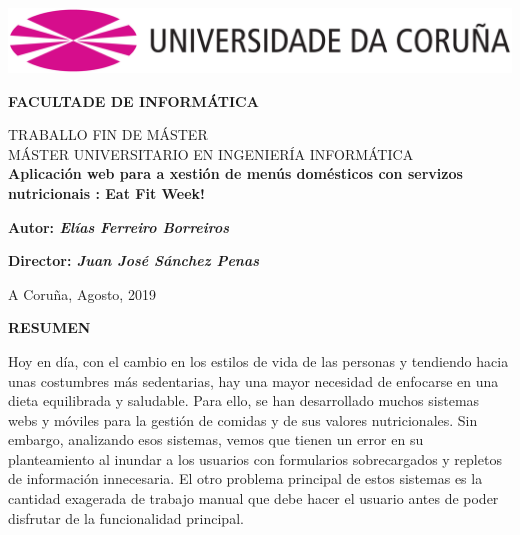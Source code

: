 \documentclass[12pt, a4paper, twoside]{book}
\begin{document}
	
	
	\thispagestyle{empty} 	
	
	\begin{center}		
		\includegraphics[width=15cm]{Imagenes/Simbolo_logo_UDC.png}
	\end{center}
	
	\vspace{2cm}
	
	\begin{center}		
		{\textbf{ FACULTADE DE INFORMÁTICA}}
			
		\vspace{1cm}
		\LARGE{ TRABALLO FIN DE MÁSTER }	\\
		\LARGE{ MÁSTER UNIVERSITARIO EN INGENIERÍA INFORMÁTICA } \\
		\vspace{1cm}	
		\LARGE{\textbf{ Aplicación web para a xestión de menús domésticos con servizos nutricionais : Eat Fit Week! }}
	\end{center}
	
	\vspace{2cm}
	\hfill \textbf{Autor: \textit{Elías Ferreiro Borreiros}}
	
	
	\hfill \textbf{Director: \textit{Juan José Sánchez Penas}} 
	
	
	\hfill A Coruña, Agosto, 2019					
	
	\clearpage
	
	\begin{center}
		\LARGE{\textbf{ RESUMEN }}	
	\end{center}
	Hoy en día, con el cambio en los estilos de vida de las personas y tendiendo hacia unas costumbres más sedentarias, hay una mayor necesidad de enfocarse en una dieta equilibrada y saludable.
	Para ello, se han desarrollado muchos sistemas webs y móviles para la gestión de comidas y de sus valores nutricionales.	Sin embargo, analizando esos sistemas, vemos que tienen un error en su planteamiento al inundar a los usuarios con formularios sobrecargados y repletos de información innecesaria. 
	El otro problema principal de estos sistemas es la cantidad exagerada de trabajo manual que debe hacer el usuario antes de poder disfrutar de la funcionalidad principal. 
\end{document}
